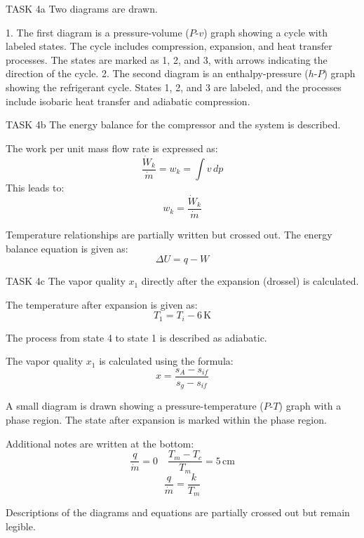 TASK 4a  
Two diagrams are drawn.  

1. The first diagram is a pressure-volume (\(P\)-\(v\)) graph showing a cycle with labeled states. The cycle includes compression, expansion, and heat transfer processes. The states are marked as 1, 2, and 3, with arrows indicating the direction of the cycle.  
2. The second diagram is an enthalpy-pressure (\(h\)-\(P\)) graph showing the refrigerant cycle. States 1, 2, and 3 are labeled, and the processes include isobaric heat transfer and adiabatic compression.  

TASK 4b  
The energy balance for the compressor and the system is described.  

The work per unit mass flow rate is expressed as:  
\[
\frac{\dot{W}_k}{\dot{m}} = w_k = \int v \, dp
\]  
This leads to:  
\[
w_k = \frac{\dot{W}_k}{\dot{m}}
\]  

Temperature relationships are partially written but crossed out. The energy balance equation is given as:  
\[
\Delta U = q - W
\]  

TASK 4c  
The vapor quality \(x_1\) directly after the expansion (drossel) is calculated.  

The temperature after expansion is given as:  
\[
T_1 = T_i - 6 \, \text{K}
\]  

The process from state 4 to state 1 is described as adiabatic.  

The vapor quality \(x_1\) is calculated using the formula:  
\[
x = \frac{s_A - s_{if}}{s_g - s_{if}}
\]  

A small diagram is drawn showing a pressure-temperature (\(P\)-\(T\)) graph with a phase region. The state after expansion is marked within the phase region.  

Additional notes are written at the bottom:  
\[
\frac{q}{\dot{m}} = 0 \quad \frac{T_m - T_c}{T_m} = 5 \, \text{cm}
\]  
\[
\frac{q}{\dot{m}} = \frac{k}{T_m}
\]  

Descriptions of the diagrams and equations are partially crossed out but remain legible.